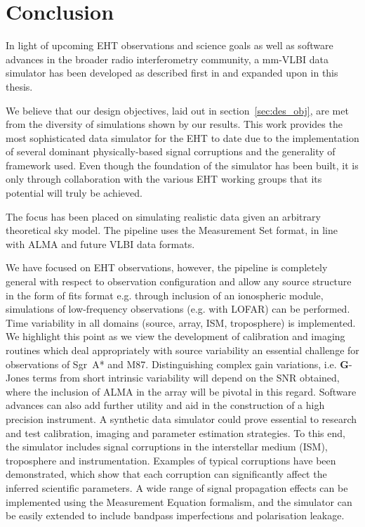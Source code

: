 \chapter{Conclusion} %

In light of upcoming EHT observations and science goals as well as software advances in the broader radio interferometry community, a mm-VLBI data simulator has been developed as described first in \citet{Blecher_2016} and expanded upon in this thesis.

We believe that our design objectives, laid out in section~\ref{sec:des_obj}, are met from the diversity of simulations shown by our results. This work provides the most sophisticated data simulator for the EHT to date due to the implementation of several dominant physically-based signal corruptions and the generality of framework used. Even though the foundation of the simulator has been built, it is only through collaboration with the various EHT working groups that its potential will truly be achieved.


The focus has been placed on simulating realistic data given an arbitrary theoretical sky model. The pipeline uses the {\sc Measurement Set} format, in line with ALMA and future VLBI data formats.


We have focused on EHT observations, however, the pipeline is completely general with respect to observation configuration and allow any source structure in the form of {\sc fits} format e.g. through inclusion of an ionospheric module, simulations of low-frequency observations (e.g. with LOFAR) can be performed. 
Time variability in all domains (source, array, ISM, troposphere) is implemented. We highlight this point as we view the development of calibration and imaging routines which deal appropriately with source variability an essential challenge for observations of Sgr~A* and M87. Distinguishing complex gain variations, i.e. $\bm G$-Jones terms from short intrinsic variability will depend on the SNR obtained, where the inclusion of ALMA in the array will be pivotal in this regard. Software advances can also add further utility and aid in the construction of a high precision instrument. A synthetic data simulator could prove essential to research and test calibration, imaging and parameter estimation strategies.
To this end, the simulator includes signal corruptions in the interstellar medium (ISM), troposphere and instrumentation. Examples of typical corruptions have been demonstrated, which show that each corruption can significantly affect the inferred scientific parameters. A wide range of signal propagation effects can be implemented using the Measurement Equation formalism, and the simulator can be easily extended to include bandpass imperfections and polarisation leakage.


